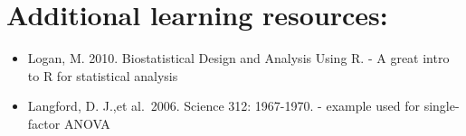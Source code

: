 \documentclass[
]{book}
\begin{document}
\hypertarget{additional-learning-resources-6}{%
\section{Additional learning resources:}\label{additional-learning-resources-6}}

\begin{itemize}
\item
  Logan, M. 2010. Biostatistical Design and Analysis Using R. - A great intro to R for statistical analysis
\item
  Langford, D. J.,et al.~2006. Science 312: 1967-1970. - example used for single-factor ANOVA
\end{itemize}

  
\end{document}
